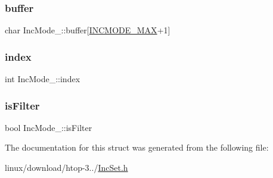 \subsubsection{\texorpdfstring{buffer}{buffer}}
{\footnotesize\ttfamily char Inc\+Mode\+\_\+\+::buffer\mbox{[}\hyperlink{IncSet_8h_a7f8869def47bfc5a3199348e5d3e450a}{I\+N\+C\+M\+O\+D\+E\+\_\+\+M\+AX}+1\mbox{]}}

\mbox{\label{structIncMode___a9ed1c40b60d9085af3e309ea7f1af280}} 
\subsubsection{\texorpdfstring{index}{index}}
{\footnotesize\ttfamily int Inc\+Mode\+\_\+\+::index}

\mbox{\label{structIncMode___a31d1b4f522fb3c2ad690968b8dd44ab1}} 
\subsubsection{\texorpdfstring{is\+Filter}{isFilter}}
{\footnotesize\ttfamily bool Inc\+Mode\+\_\+\+::is\+Filter}



The documentation for this struct was generated from the following file\+:\begin{DoxyCompactItemize}
\item 
linux/download/htop-\/3../\hyperlink{IncSet_8h}{Inc\+Set.\+h}\end{DoxyCompactItemize}
